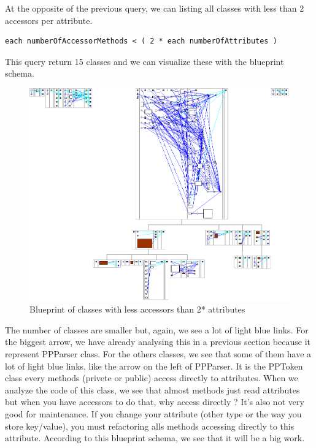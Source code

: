 At the opposite of the previous query, we can listing all classes with less than 2 accessors per attribute.
\begin{lstlisting}
each numberOfAccessorMethods < ( 2 * each numberOfAttributes ) 
\end{lstlisting}
This query return 15 classes and we can visualize these with the blueprint schema.\\
\begin{figure}[ht]
\centering
\label{less_access_blueprint}
\includegraphics[scale=0.35]{less_access_blueprint.png}
\caption{Blueprint of classes with less accessors than 2* attributes}
\end{figure}
The number of classes are smaller but, again, we see a lot of light blue links.  For the biggest arrow, we have already analysing this in a previous section because it represent PPParser class.  For the others classes, we see that some of them have a lot of light blue links, like the arrow on the left of PPParser.  It is the PPToken class every methods (privete or public) access directly to attributes.  When we analyze the code of this class, we see that almost methods just read attributes but when you have accessors to do that, why access directly ?  It's also not very good for maintenance.  If you change your attribute (other type or the way you store key/value), you must refactoring alls methods accessing directly to this attribute.  According to this blueprint schema, we  see that it will be a big work.\\


